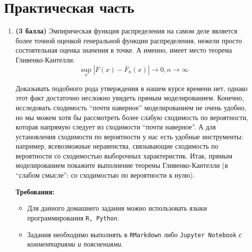 \documentclass{assignment}
\begin{document}
\section*{Практическая часть}
\begin{enumerate}
    \item \textbf{(3 балла)} Эмпирическая функция распределения на самом деле является более точной оценкой генеральной функции распределения, нежели просто состоятельная оценка значения в точке. А именно, имеет место теорема Гливенко-Кантелли:
    $$\sup_x |F(x) - \bar{F}_n(x)| \to 0, n \to \infty$$

    Доказывать подобного рода утверждения в нашем курсе времени нет, однако этот факт достаточно несложно увидеть прямым моделированием. Конечно, исследовать сходимость “почти наверное” моделированием не очень удобно, но мы можем хотя бы рассмотреть более слабую сходимость по вероятности, которая напрямую следует из сходимости “почти наверное”. А для установления сходимости по вероятности у нас есть удобные инструменты: например, всевозможные неравенства, связывающие сходимость по вероятности со сходимостью выборочных характеристик.
    Итак, прямым моделированием покажите выполнение теоремы Гливенко-Кантелли (в “слабом смысле”: со сходимостью по вероятности к нулю). 

    \textbf{Требования:}
    \begin{itemize}
         \item Для данного домашнего задания можно использовать языки программирования \texttt{R, Python}.
         \item Задания необходимо выполнять в \texttt{RMarkdown} либо \texttt{Jupyter Notebook} \textit{с комментариями и пояснениями}.
    \end{itemize}

\end{enumerate}
\end{document}
